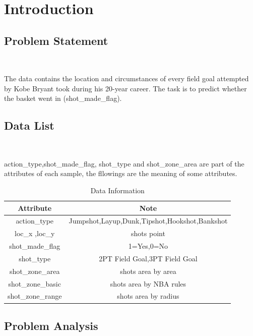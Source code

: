 
\section{Introduction}\label{sec-intro}

\subsection{Problem Statement}
\

The data contains the location and circumstances of every field goal 
attempted by Kobe Bryant took during his 20-year career. The task is to predict 
whether the basket went in (shot_made_flag).




\subsection{Data List}
\

\DIFdelbegin {}\DIFdelend \DIFaddbegin {}\DIFaddend action_type,shot_made_flag,  
shot_type and shot_zone_area are part of the attributes of each sample,
the fllowings are the meaning of some attributes.

\begin{table}[htbp]
	\centering
	\begin{tabular}{cc}
		\toprule  %
		Attribute& Note\\
		\hline
		action_type & Jumpshot,Layup,Dunk,Tipshot,Hookshot,Bankshot\\
		loc_x ,loc_y & shots point\\
		shot_made_flag & 1=Yes,0=No\\
		shot_type & 2PT Field Goal,3PT Field Goal\\
		shot_zone_area & shots area by area\\
		shot_zone_basic & shots area by  NBA rules\\
		shot_zone_range & shots area by radius\\

		\bottomrule %
	\end{tabular}
	\bigskip
	\caption{Data Information}
\end{table}
\label{table1}



\subsection{Problem Analysis}

